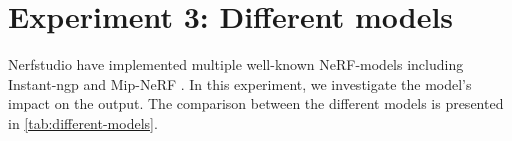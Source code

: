 \begin{comment}
This subsection presents an experiment designed to assess the relative merits of two distinct strategies for refining initial camera poses. Specifically, we compare the direct optimization of rough camera poses within the model training pipeline against the pre-processing of such poses with the help of COLMAP. The main question under investigation here is whether the benefits of optimizing the rough camera poses directly can outweigh those of employing a sophisticated SfM tool like COLMAP, despite the potential for a more substantial time investment.

might offer the benefit of faster processing time, COLMAP consistently delivers superior performance across all metrics, regardless of segment size.
COLMAP doesn't optimize initial poses, but instead approximates camera poses from a set of input images. 
Comparing those results with \autoref{tab:colmap-vs-poses}, we observe that the runs with poses approximated by COLMAP deliver superior performance
Comparing the results in \autoref{tab:colmap-vs-poses} and \autoref{tab:exp-gaussian-noise} it becomes apparent that although direct pose optimization might offer the benefit of faster processing time, COLMAP consistently delivers superior performance across all metrics, regardless of segment size. The results thus suggest that employing COLMAP for initial pose refinement could significantly improve model performance when the initial camera poses are inaccurate, despite the longer processing time required.
\end{comment}













\section{Experiment 3: Different models}
Nerfstudio have implemented multiple well-known NeRF-models including Instant-ngp \cite{mullerInstantNeuralGraphics2022} and Mip-NeRF \cite{barronMipNeRFMultiscaleRepresentation2021}. In this experiment, we investigate the model's impact on the output. The comparison between the different models is presented in \autoref{tab:different-models}.

